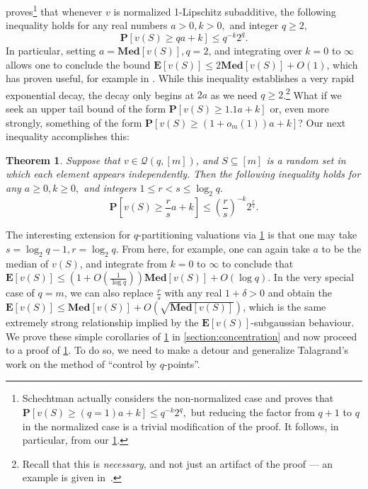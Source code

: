 \documentclass[11pt]{article}%
\newtheorem{theorem}{Theorem}
\numberwithin{theorem}{subsection}
\newcommand{\prob}{\mathbf{P}}
\newcommand{\median}{\mathbf{Med}}
\newcommand{\expect}{\mathbf{E}}
\begin{document}
\cite{schectman} proves\footnote{Schechtman actually considers the non-normalized case and proves that $\prob[v(S)\ge (q=1)a + k]\le 
q^{-k}2^q,$ but reducing the factor from $q+1$ to $q$ in the normalized case is a trivial modification of the proof. It follows, in particular, from our \cref{thm:qparttailspecial}.} that whenever $v$ is normalized 1-Lipschitz subadditive, the following inequality holds for any real numbers $a>0, k>0,$ and integer $q\ge 2,$ \begin{equation}
\label{eq:schehtman}
\prob[v(S)\ge qa + k]\le 
q^{-k}2^q.
\end{equation} In particular, setting $a = \median[v(S)],q=2$, and integrating over $k=0$ to $\infty$ allows one to conclude the bound $\expect[v(S)]\le 2\median[v(S)] + O(1)$, which has proven useful, for example in \cite{RubinsteinW18}. While this inequality establishes a very rapid exponential decay, the decay only begins at  $2a$ as we need $q\ge 2$.\footnote{Recall that this is \emph{necessary}, and not just an artifact of the proof --- an example is given in~\cite{Vondrak10}.} What if we seek an upper tail bound of the form $\prob[v(S)\ge 1.1a + k]$ or, even more strongly, something of the form  $\prob[v(S)\ge (1 + {o_m(1)})a + k]$? Our next inequality accomplishes this:

\begin{theorem}
\label{thm:qparttailspecial}
Suppose that $v\in \mathcal{Q}(q,[m])$, and $S\subseteq [m]$ is a random set in which each element appears independently. Then the following inequality holds for any $ a \ge 0, k\ge 0,$ and integers $1\le r < s\le \log_2 q.$
    $$
    \prob\left[v(S)\ge \frac{r}{s}a+k\right]\le 
    \left(\frac{r}{s}\right)^{-k}2^\frac{r}{s}.
    $$
\end{theorem}

 The interesting extension for $q$-partitioning valuations via \cref{thm:qparttailspecial} is that one may take\linebreak $s = \log_2 q-1, r = \log_2 q$. From here, for example, one can again take $a$ to be the median of $v(S)$, and integrate from $k=0$ to $\infty$ to conclude that $\expect[v(S)]\le (1 + O(\frac{1}{\log q}))\median[v(S)] + O(\log q).$
In the very special case of $q=m$, we can also replace $\frac{r}{s}$ with any real $1+ \delta >0$ and obtain the $\expect[v(S)]\le \median[v(S)] + O(\sqrt{\median[v(S)]})$, which is the same extremely strong relationship implied by the $\expect[v(S)]$-subgaussian behaviour. We prove these simple corollaries of \cref{thm:qparttailspecial} in \cref{section:concentration} and now proceed to 
a proof of 
\cref{thm:qparttailspecial}. To do so, we need to make a detour and generalize Talagrand's work on the method of ``control by $q$-points''.
\end{document}
